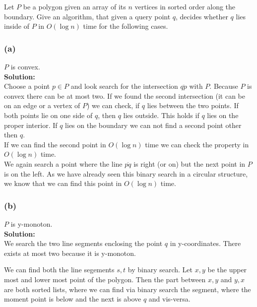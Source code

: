 \documentclass[11pt,a4paper,ngerman]{article}
\begin{document}
Let $P$ be a polygon given an array of its $n$ vertices in sorted order along the boundary. Give an algorithm, that given a query point $q$, decides
whether $q$ lies inside of $P$ in $O(\log n)$ time for the following cases.

\subsubsection*{(a)}

$P$ is convex.\\

\textbf{Solution:}\\

Choose a point $p \in P$ and look search for the intersection $\overline{qp}$ with $P$. Because $P$ is convex there can be at most two.
If we found the second intersection (it can be on an edge or a vertex of $P$) we can check, if $q$ lies between the two points.
If both points lie on one side of $q$, then $q$ lies outside. This holds if $q$ lies on the proper interior. If $q$ lies on the boundary
we can not find a second point other then $q$.\\

If we can find the second point in $O(\log n)$ time we can check the property in $O(\log n)$ time.\\

We again search a point where the line $\overline{pq}$ is right (or on) but the next point in $P$ is on the left. As we have already seen
this binary search in a circular structure, we know that we can find this point in $O(\log n)$ time.

\subsubsection*{(b)}

$P$ is y-monoton.\\

\textbf{Solution:}\\

We search the two line segments enclosing the point $q$ in y-coordinates. There exists at most two because it is y-monoton.

We can find both the line segements $s,t$ by binary search. Let $x,y$ be the upper most and lower most point of the polygon.
Then the part between $x,y$ and $y,x$ are both sorted lists, where we can find via binary search the segment, where
the moment point is below and the next is above $q$ and vis-versa.
\end{document}
